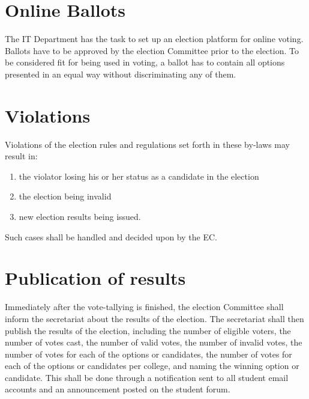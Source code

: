 

\section{Online Ballots} 
The IT Department has the task to set up an election platform for online voting. Ballots have to be approved by the election Committee prior to the election. To be considered fit for being used in voting, a ballot has to contain all options presented in an equal way without discriminating any of them.

\section{Violations} 
Violations of the election rules and regulations set forth in these by-laws may result in:
\begin{enumerate}[nosep]
\item the violator losing his or her status as a candidate in the election
\protect{}\protect{}
\item the election being invalid
\item new election results being issued.
\end{enumerate}
Such cases shall be handled and decided upon by the EC.

\section{Publication of results}
Immediately after the vote-tallying is finished, the election Committee shall inform the secretariat about the results of the election. The secretariat shall then publish the results of the election, including the number of eligible voters, the number of votes cast, the number of valid votes, the number of invalid votes, the number of votes for each of the options or candidates, the number of votes for each of the options or candidates per college, and naming the winning option or candidate. This shall be done through a notification sent to all student email accounts and an announcement posted on the student forum.

